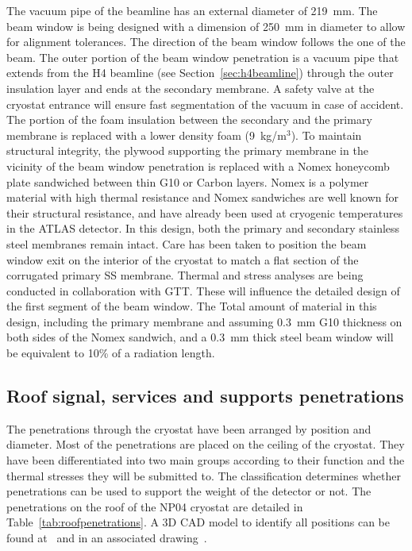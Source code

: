   The vacuum pipe of the beamline has an external diameter of 219~mm. The beam window is being designed with a dimension of 250~mm in diameter to allow for alignment tolerances.  The direction of the beam window follows the one of the beam.
The outer portion of the
beam window penetration is a vacuum pipe that extends from the H4 beamline (see Section~\ref{sec:h4beamline})  through the outer insulation layer and ends at the secondary
membrane. A safety valve at the cryostat entrance will ensure fast segmentation of the vacuum in case of accident.   The
portion of the foam insulation between the secondary and the primary
membrane is replaced with a lower density foam %
(9~kg/m$^3$).
To maintain structural integrity, the plywood supporting
the primary membrane in the vicinity of the beam window penetration is
replaced with a Nomex honeycomb plate sandwiched between thin G10 or Carbon layers. Nomex is a polymer material with high thermal resistance and Nomex sandwiches are well known for their structural resistance, and have already been used at cryogenic temperatures in the ATLAS detector.
 In this design, both the
primary and secondary stainless steel membranes remain intact. Care has been taken to position the beam window exit on the interior of the cryostat to match a flat section of the corrugated primary SS membrane.
Thermal and stress analyses are being conducted in collaboration with GTT. These will influence the detailed design of the first segment of the beam window. 
The Total amount of material in this design, including the primary membrane and assuming 0.3~mm G10 thickness on both sides of the Nomex sandwich, and a 0.3~mm thick steel beam window will be equivalent to 10\% of a radiation length. 

\subsection{Roof signal, services and supports penetrations}

The penetrations through the cryostat have been arranged by position and diameter. %
Most of the penetrations are placed on the ceiling of the cryostat. They have been differentiated into two main groups according to their function and the thermal stresses they will be submitted to. The classification determines whether penetrations can be used to support the weight of the detector or not.
The penetrations on the roof of the NP04 cryostat are detailed in Table~\ref{tab:roofpenetrations}.  
A 3D CAD model to identify all positions can be found at~\cite{edms4} and in an associated drawing~\cite{edms5}.


